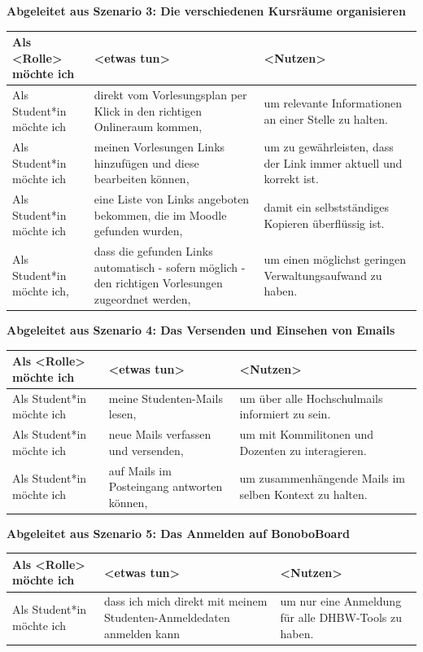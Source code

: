 \documentclass[a4paper,11pt]{scrartcl}
\begin{document}
\noindent\textbf{Abgeleitet aus Szenario 3: Die verschiedenen Kursräume organisieren} \par\noindent
\begin{table}[H]
\begin{tabular}{|p{4.5cm}|p{5cm}|p{5cm}|}
\hline
\textbf{Als <Rolle> möchte ich} &\textbf{ <etwas tun>} &\textbf{ <Nutzen>} \\ \hline
Als Student*in möchte ich & direkt vom Vorlesungsplan per Klick in den richtigen Onlineraum kommen, & um relevante Informationen an einer Stelle zu halten.  \\ \hline
Als Student*in möchte ich & meinen Vorlesungen Links hinzufügen und diese bearbeiten können, & um zu gewährleisten, dass der Link immer aktuell und korrekt ist.  \\ \hline
Als Student*in möchte ich & eine Liste von Links angeboten bekommen, die im Moodle gefunden wurden, & damit ein selbstständiges Kopieren überflüssig ist.  \\ \hline
Als Student*in möchte ich, & dass die gefunden Links automatisch - sofern möglich - den richtigen Vorlesungen zugeordnet werden, &  um einen möglichst geringen Verwaltungsaufwand zu haben. \\ \hline
\end{tabular}
\end{table}
\noindent\textbf{Abgeleitet aus Szenario 4: Das Versenden und Einsehen von Emails} \par\noindent
\begin{table}[H]
\begin{tabular}{|p{4.5cm}|p{5cm}|p{5cm}|}
\hline
\textbf{Als <Rolle> möchte ich} &\textbf{ <etwas tun>} &\textbf{ <Nutzen>} \\ \hline
Als Student*in möchte ich & meine Studenten-Mails lesen, &  um über alle Hochschulmails informiert zu sein. \\ \hline
Als Student*in möchte ich & neue Mails verfassen und versenden, & um mit Kommilitonen und Dozenten zu interagieren.  \\ \hline
Als Student*in möchte ich & auf Mails im Posteingang antworten können, & um zusammenhängende Mails im selben Kontext zu halten.   \\ \hline
\end{tabular}
\end{table}
\noindent\textbf{Abgeleitet aus Szenario 5: Das Anmelden auf BonoboBoard} \par\noindent
\begin{table}[H]
\begin{tabular}{|p{4.5cm}|p{5cm}|p{5cm}|}
\hline
\textbf{Als <Rolle> möchte ich} &\textbf{ <etwas tun>} &\textbf{ <Nutzen>} \\ \hline
Als Student*in möchte ich & dass ich mich direkt mit meinem Studenten-Anmeldedaten anmelden kann  & um nur eine Anmeldung für alle DHBW-Tools zu haben.  \\ \hline
\end{tabular}
\end{table}
\newpage
\end{document}
